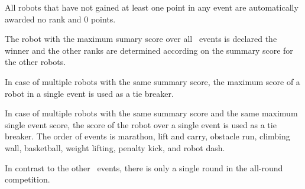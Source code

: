 \documentclass[12pt]{hurocup}
\begin{document}

\begin{lawlist}[ALR]

\item All robots that have not gained at least one point in any event
 are automatically awarded no rank and $0$ points.

\item The robot with the maximum sumary score over all \HuroCup\
 events is declared the winner and the other ranks are determined
 according on the summary score for the other robots.

\item In case of multiple robots with the same summary score, the
  maximum score of a robot in a single event is used as a tie breaker.

\item In case of multiple robots with the same summary score and the
  same maximum single event score, the score of the robot over a
  single event is used as a tie breaker. The order of events is
  marathon, lift and carry, obstacle run, climbing wall, basketball,
  weight lifting, penalty kick, and robot dash.

\item In contrast to the other \HuroCup\ events, there is only a
 single round in the all-round competition. 

\end{lawlist}
\end{document}

